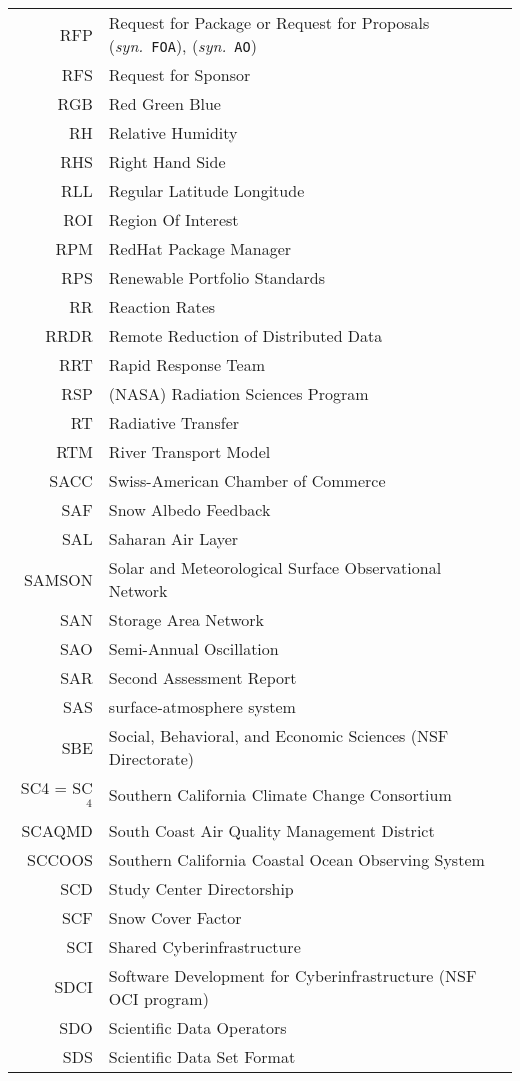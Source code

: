 \documentclass[12pt,twoside]{article}
\newcommand{\syn}[1]{(\textit{syn.}~\texttt{#1})}
\begin{document}
\begin{longtable}[>{\bfseries}l]{>{\ttfamily}r l}
RFP & Request for Package or Request for Proposals \syn{FOA}, \syn{AO} \\
RFS & Request for Sponsor  \\
RGB & Red Green Blue \\
RH & Relative Humidity \\
RHS & Right Hand Side \\
RLL & Regular Latitude Longitude \\
ROI & Region Of Interest \\
RPM & RedHat Package Manager \\
RPS & Renewable Portfolio Standards \\
RR & Reaction Rates \\
RRDR & Remote Reduction of Distributed Data \\
RRT & Rapid Response Team \\
RSP & (NASA) Radiation Sciences Program \\
RT & Radiative Transfer \\
RTM & River Transport Model \\
SACC & Swiss-American Chamber of Commerce \\
SAF & Snow Albedo Feedback \\
SAL & Saharan Air Layer \\
SAMSON & Solar and Meteorological Surface Observational Network \\
SAN & Storage Area Network \\
SAO & Semi-Annual Oscillation \\
SAR & Second Assessment Report \\
SAS & surface-atmosphere system \\
SBE & Social, Behavioral, and Economic Sciences (NSF Directorate) \\
SC4 = SC$^{4}$ & Southern California Climate Change Consortium \\
SCAQMD & South Coast Air Quality Management District \\
SCCOOS & Southern California Coastal Ocean Observing System \\
SCD & Study Center Directorship \\
SCF & Snow Cover Factor \\
SCI & Shared Cyberinfrastructure \\
SDCI & Software Development for Cyberinfrastructure (NSF OCI program) \\
SDO & Scientific Data Operators \\
SDS & Scientific Data Set Format \\

\end{longtable}
\end{document}
